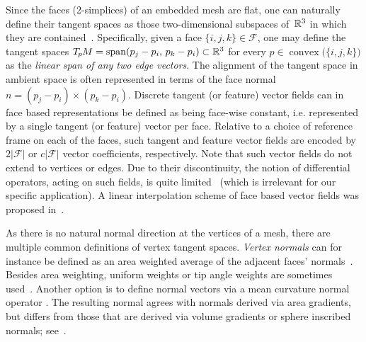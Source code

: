 Since the faces (2-simplices) of an embedded mesh are flat, one can naturally define their tangent spaces as those two-dimensional subspaces of~$\mathbb{R}^3$ in which they are contained~\cite{craneTrivialConnectionsDiscrete2010,craneDiscreteDifferentialGeometry2014,wang2012surfaceReconstruction}.
Specifically, given a face $\{i,j,k\} \in \mathcal{F}$, one may define the tangent spaces $T_{\mkern-1.5mu p}\mkern-.5muM = \operatorname{span}(p_j-p_i,\, p_k-p_i) \subset \mathbb{R}^3$ for every $p\in \operatorname{convex}\!\big(\{i,j,k\}\big)$ as the \emph{linear span of any two edge vectors}.
The alignment of the tangent space in ambient space is often represented in terms of the face normal $n = (p_j-p_i) \times (p_k-p_i)$.
Discrete tangent (or feature) vector fields can in face based representations be defined as being face-wise constant, i.e. represented by a single tangent (or feature) vector per face.
Relative to a choice of reference frame on each of the faces, such tangent and feature vector fields are encoded by $2|\mathcal{F}|$ or $c|\mathcal{F}|$ vector coefficients, respectively.
Note that such vector fields do not extend to vertices or edges.
Due to their discontinuity, the notion of differential operators, acting on such fields, is quite limited~\cite{deGoes2016VectorFieldProcessing} (which is irrelevant for our specific application).
A linear interpolation scheme of face based vector fields was proposed in~\cite{li2006representing}.


As there is no natural normal direction at the vertices of a mesh, there are multiple common definitions of vertex tangent spaces.
\emph{Vertex normals} can for instance be defined as an area weighted average of the adjacent faces' normals~\cite{lipman2005linear,lai2009metric,deHaan2020meshCNNs}.
Besides area weighting, uniform weights or tip angle weights are sometimes used~\cite{craneDiscreteDifferentialGeometry2014}.
Another option is to define normal vectors via a mean curvature normal operator \cite{meyer2003discrete}.
The resulting normal agrees with normals derived via area gradients, but differs from those that are derived via volume gradients or sphere inscribed normals; see~\cite{craneDiscreteDifferentialGeometry2014}.


